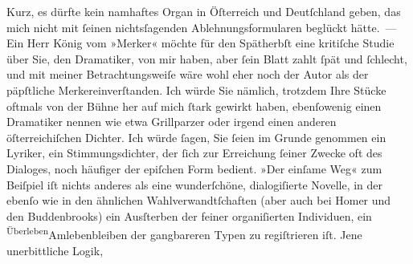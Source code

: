 \begin{ledgroupsized}[t]{13cm}
                    Kurz, es dürfte kein namhaftes Organ in Öſterreich und Deutſchland geben, das
                    mich nicht mit ſeinen nichtsſagenden Ablehnungsformularen beglückt hätte. — Ein
                    Herr König vom »Merker« möchte für den Spätherbſt eine kritiſche Studie über Sie, den
                    Dramatiker, von mir haben, aber ſein Blatt zahlt ſpät und ſchlecht, und mit
                    meiner Betrachtungsweiſe wäre wohl eher noch der Autor als der päpſtliche Merkereinverſtanden. Ich würde Sie
                    nämlich, trotzdem Ihre Stücke oftmals von der Bühne her auf mich ſtark gewirkt
                    haben, ebenſowenig einen Dramatiker nennen wie etwa Grillparzer oder irgend einen anderen öſterreichiſchen Dichter. Ich würde ſagen, Sie ſeien im
                    Grunde genommen ein Lyriker, ein Stimmungsdichter, der ſich zu\introOben{}r\introOben{}{ } Erreichung ſeiner Zwecke oft des
                    Dialoges, noch häufiger der epiſchen Form bedient. »Der einſame Weg« zum Beiſpiel iſt nichts \introOben{}anderes\introOben{} als eine wunderſchöne, dialogiſierte Novelle, in der ebenſo
                    wie in den ähnlichen Wahlverwandtſchaften
                    (aber auch bei Homer und den Buddenbrooks) ein Ausſterben der feiner organiſierten
                    Individuen, ein \substVorne{}\textsuperscript{Überleben}{\allowbreak}\substDazwischen{}Amlebenbleiben\substHinten{} der gangbareren Typen zu regiſtrieren iſt. Jene unerbittliche Logik,

\end{ledgroupsized}
